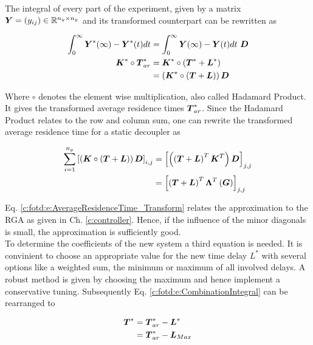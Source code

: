 The integral of every part of the experiment, given by a matrix $\mbox{\boldmath$Y$} = (y_{ij}) \in \mathbb{R}^{n_y \times n_y}$ and its transformed counterpart can be rewritten as

\begin{align}
\begin{split}
\int_0^\infty \mbox{\boldmath$Y$}^*(\infty) - \mbox{\boldmath$Y$}^*(t) dt &= \int_0^\infty \mbox{\boldmath$Y$}(\infty) - \mbox{\boldmath$Y$}(t) dt ~\mbox{\boldmath$D$} \\
\mbox{\boldmath$K$}^* \circ \mbox{\boldmath$T$}_{ar}^{*} &= \mbox{\boldmath$K$}^* \circ \left( \mbox{\boldmath$T$}^* + \mbox{\boldmath$L$}^* \right) \\
&= \left(\mbox{\boldmath$K$}^* \circ \left( \mbox{\boldmath$T$} + \mbox{\boldmath$L$} \right) \right) \mbox{\boldmath$D$}\\
\end{split}
\label{c:fotd:e:CombinationIntegral}
\end{align}

Where $\circ$ denotes the element wise multiplication, also called Hadamard Product. It gives the transformed average residence times $\mbox{\boldmath$T$}_{ar}^*$. Since the Hadamard Product relates to the row and column sum, one can rewrite the transformed average residence time for a static decoupler as

\begin{align}
\begin{split}
\sum_{i = 1}^{n_y} \left[ \left(\mbox{\boldmath$K$} \circ \left( \mbox{\boldmath$T$} + \mbox{\boldmath$L$} \right) \right) \mbox{\boldmath$D$} \right]_{i,j} &= \left[\left(\left( \mbox{\boldmath$T$} + \mbox{\boldmath$L$} \right)^T \mbox{\boldmath$K$}^T \right) \mbox{\boldmath$D$} \right]_{j,j}\\
&= \left[\left( \mbox{\boldmath$T$} + \mbox{\boldmath$L$} \right)^T \mbox{\boldmath$\Lambda$}^T\left( \mbox{\boldmath$G$} \right) \right]_{j,j} 
\end{split}
\label{c:fotd:e:AverageResidenceTime_Transform}
\end{align}
 
Eq. \ref{c:fotd:e:AverageResidenceTime_Transform} relates the approximation to the RGA as given in Ch. \ref{c:controller}. Hence, if the influence of the minor diagonals is small, the approximation is sufficiently good.\\

To determine the coefficients of the new system a third equation is needed. It is convinient to choose an appropriate value for the new time delay $L^*$ with several options like a weighted sum, the minimum or maximum of all involved delays. A robust method is given by choosing the maximum and hence implement a conservative tuning. Subsequently Eq. \ref{c:fotd:e:CombinationIntegral} can be rearranged to

\begin{align}
\begin{split}
\mbox{\boldmath$T$}^* &= \mbox{\boldmath$T$}_{ar}^* - \mbox{\boldmath$L$}^* \\
&= \mbox{\boldmath$T$}_{ar}^* - \mbox{\boldmath$L$}_{Max} 
\end{split}
\label{c:fotd:e:CombinationTimeConstant}
\end{align}

